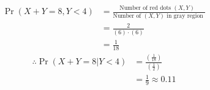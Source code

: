 \documentclass[journal,12pt,twocolumn]{IEEEtran}
\providecommand{\pr}[1]{\ensuremath{\Pr\left(#1\right)}}
\providecommand{\brak}[1]{\ensuremath{\left(#1\right)}}
\theoremstyle{remark}
\begin{document}
\begin{enumerate}[label=(\alph*)]
\begin{align}
    \pr{X+Y = 8, Y<4} &= \frac{\text{Number of red dots $(X,Y)$ }}{\text{Number of $(X,Y)$ in gray region }}\\
    &= \frac{2}{\brak{6}\cdot\brak{6}}\\
         &=\frac{1}{18} 
    \end{align}
    \begin{align}
    \therefore \pr{X+Y = 8 | Y < 4} &= \frac{\brak{\frac{1}{18}}}{\brak{\frac{1}{2}}}\\
    &=\frac{1}{9} \approx 0.11
\end{align}


\end{enumerate}
\end{document}
